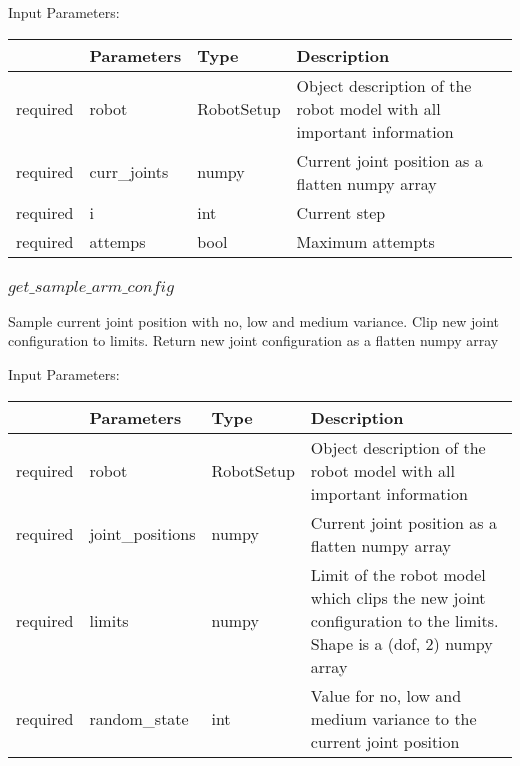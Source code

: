 \documentclass[
	ngerman,
	accentcolor=9c,%
	type=intern,
	marginpar=false
	]{tudapub}
\begin{document}
\vspace{0.5cm}
\noindent Input Parameters:
\vspace{0.5cm}


\begin{tabular}{|p{}|p{}|p{}| p{}|}
\hline
 & \textbf{Parameters} & \textbf{Type} & \textbf{Description} \\
\hline
required & robot & RobotSetup & Object description of the robot model with all important information \\
\hline
required & curr\_joints & numpy & Current joint position as a flatten numpy array \\
\hline
required & i & int & Current step \\
\hline
required & attemps & bool & Maximum attempts \\
\hline
\end{tabular}
\vspace{1cm}


\subsubsection{$get\_sample\_arm\_config$}
\noindent Sample current joint position with no, low and medium variance. Clip new joint configuration to limits.  Return new joint configuration as a flatten numpy array

\vspace{0.5cm}
\noindent Input Parameters:
\vspace{0.5cm}


\begin{tabular}{|p{}|p{}|p{}| p{}|}
\hline
 & \textbf{Parameters} & \textbf{Type} & \textbf{Description} \\
\hline
required & robot & RobotSetup & Object description of the robot model with all important information \\
\hline
required & joint\_positions & numpy & Current joint position as a flatten numpy array \\
\hline
required & limits & numpy & Limit of the robot model which clips the new joint configuration to the limits. Shape is  a (dof, 2) numpy array \\
\hline
required & random\_state & int & Value for no, low and medium variance to the current joint position \\
\hline
\end{tabular}
\vspace{1cm}
\end{document}
